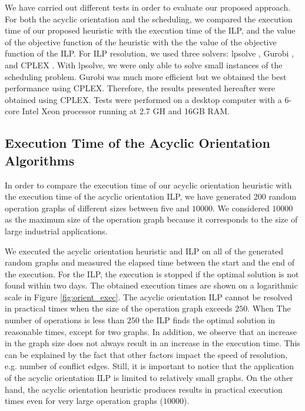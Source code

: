 We have carried out different tests in order to evaluate our proposed approach. For both the acyclic orientation and the scheduling, we compared the execution time of our proposed heuristic with the execution time of the ILP, and the value of the objective function of the heuristic with the the value of the objective function of the ILP. For ILP resolution, we used three solvers: lpsolve \cite{berkelaar:2004}, Gurobi \cite{gurobi:2016}, and CPLEX \cite{cplex:2017}. With lpsolve, we were only able to solve small instances of the scheduling problem. Gurobi was much more efficient but we obtained the best performance using CPLEX. Therefore, the results presented hereafter were obtained using CPLEX. %
Tests were performed on a desktop computer with a 6-core Intel Xeon processor running at 2.7 GH and 16GB RAM.

\subsection{Execution Time of the Acyclic Orientation Algorithms}

In order to compare the execution time of our acyclic orientation heuristic with the execution time of the acyclic orientation ILP, we have generated 200 random operation graphs of different sizes between five and $10000$. %
We considered $10000$ as the maximum size of the operation graph because it corresponds to the size of large industrial applications. 

We executed the acyclic orientation heuristic and ILP on all of the generated random graphs and measured the elapsed time between the start and the end of the execution. For the ILP, the execution is stopped if the optimal solution is not found within two days. The obtained execution times are shown on a logarithmic scale in Figure \ref{fig:orient_exec}. The acyclic orientation ILP cannot be resolved in practical times when the size of the operation graph exceeds $250$. When The number of operations is less than $250$ the ILP finds the optimal solution in reasonable times, except for two graphs. In addition, we observe that an increase in the graph size does not always result in an increase in the execution time. This can be explained by the fact that other factors impact the speed of resolution, e.g. number of conflict edges. Still, it is important to notice that the application of the acyclic orientation ILP is limited to relatively small graphs. On the other hand, the acyclic orientation heuristic produces results in practical execution times even for very large operation graphs ($10000$).

